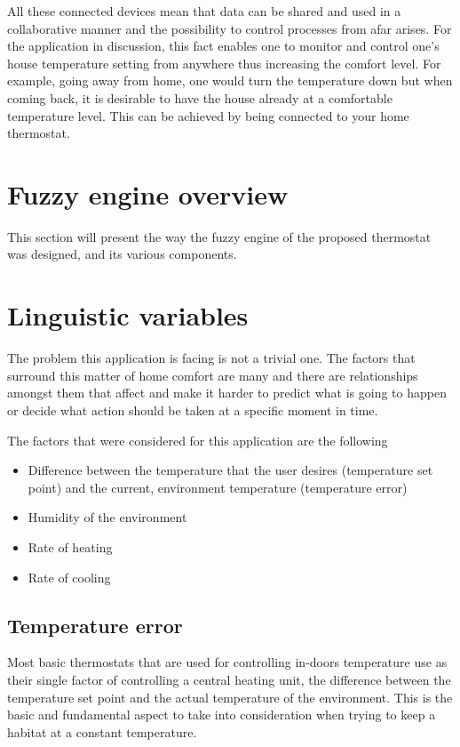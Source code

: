 \qquad All these connected devices mean that data can be shared and used in a collaborative manner and the
possibility to control processes from afar arises. For the application in discussion, this fact enables one to
monitor and control one's house temperature setting from anywhere thus increasing the comfort level. For
example, going away from home, one would turn the temperature down but when coming back, it is desirable to
have the house already at a comfortable temperature level. This can be achieved by being connected to your
home thermostat.

\section{Fuzzy engine overview}

\qquad This section will present the way the fuzzy engine of the proposed thermostat was designed, and its
various components.

\section{Linguistic variables}

\qquad The problem this application is facing is not a trivial one. The factors that surround this matter
of home comfort are many and there are relationships amongst them that affect and make it harder to predict
what is going to happen or decide what action should be taken at a specific moment in time.

The factors that were considered for this application are the following

\begin{itemize}
    \item Difference between the temperature that the user desires (temperature set point) and the current,
          environment temperature (temperature error)
    \item Humidity of the environment
    \item Rate of heating
    \item Rate of cooling
\end{itemize}

\subsection{Temperature error}

\qquad Most basic thermostats that are used for controlling in-doors temperature use as their single factor of
controlling a central heating unit, the difference between the temperature set point and the actual
temperature of the environment. This is the basic and fundamental aspect to take into consideration when
trying to keep a habitat at a constant temperature.

